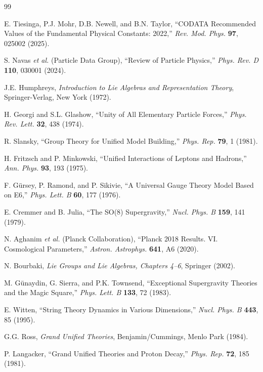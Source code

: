 \documentclass[11pt,a4paper]{article}
\begin{document}
\begin{thebibliography}{99}

E. Tiesinga, P.J. Mohr, D.B. Newell, and B.N. Taylor,
``CODATA Recommended Values of the Fundamental Physical Constants: 2022,''
\textit{Rev. Mod. Phys.} \textbf{97}, 025002 (2025).

S. Navas \textit{et al.} (Particle Data Group),
``Review of Particle Physics,''
\textit{Phys. Rev. D} \textbf{110}, 030001 (2024).

J.E. Humphreys,
\textit{Introduction to Lie Algebras and Representation Theory},
Springer-Verlag, New York (1972).

H. Georgi and S.L. Glashow,
``Unity of All Elementary Particle Forces,''
\textit{Phys. Rev. Lett.} \textbf{32}, 438 (1974).

R. Slansky,
``Group Theory for Unified Model Building,''
\textit{Phys. Rep.} \textbf{79}, 1 (1981).

H. Fritzsch and P. Minkowski,
``Unified Interactions of Leptons and Hadrons,''
\textit{Ann. Phys.} \textbf{93}, 193 (1975).

F. G\"ursey, P. Ramond, and P. Sikivie,
``A Universal Gauge Theory Model Based on E6,''
\textit{Phys. Lett. B} \textbf{60}, 177 (1976).

E. Cremmer and B. Julia,
``The SO(8) Supergravity,''
\textit{Nucl. Phys. B} \textbf{159}, 141 (1979).

N. Aghanim \textit{et al.} (Planck Collaboration),
``Planck 2018 Results. VI. Cosmological Parameters,''
\textit{Astron. Astrophys.} \textbf{641}, A6 (2020).

N. Bourbaki,
\textit{Lie Groups and Lie Algebras, Chapters 4--6},
Springer (2002).

M. G\"unaydin, G. Sierra, and P.K. Townsend,
``Exceptional Supergravity Theories and the Magic Square,''
\textit{Phys. Lett. B} \textbf{133}, 72 (1983).

E. Witten,
``String Theory Dynamics in Various Dimensions,''
\textit{Nucl. Phys. B} \textbf{443}, 85 (1995).

G.G. Ross,
\textit{Grand Unified Theories},
Benjamin/Cummings, Menlo Park (1984).

P. Langacker,
``Grand Unified Theories and Proton Decay,''
\textit{Phys. Rep.} \textbf{72}, 185 (1981).


\end{thebibliography}
\end{document}
